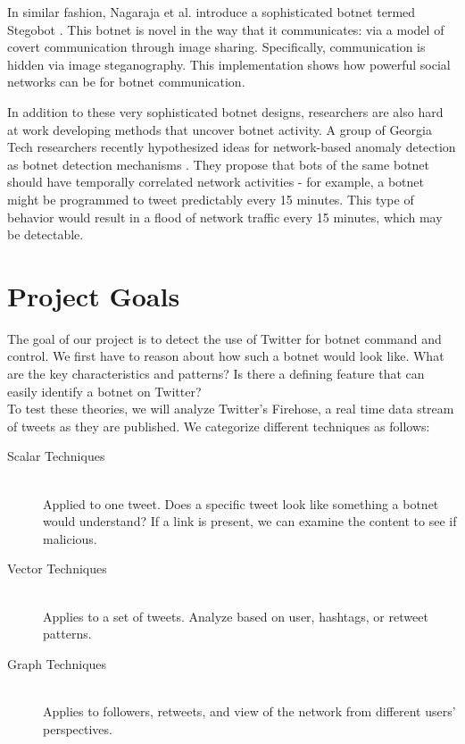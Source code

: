 \documentclass[paper=a4, fontsize=11pt]{scrartcl} %
\numberwithin{equation}{section} %
\numberwithin{figure}{section} %
\numberwithin{table}{section} %
\begin{document}
In similar fashion, Nagaraja et al. introduce a sophisticated botnet termed Stegobot \cite{stegobot}.
This botnet is novel in the way that it communicates: via a model of covert communication through image sharing. 
Specifically, communication is hidden via image steganography. 
This implementation shows how powerful social networks can be for botnet communication.

In addition to these very sophisticated botnet designs, researchers are also hard at work
developing methods that uncover botnet activity. A group of Georgia Tech researchers recently
hypothesized ideas for network-based anomaly detection as botnet detection mechanisms \cite{botsniffer}.
They propose that bots of the same botnet should have temporally correlated network activities - 
for example, a botnet might be programmed to tweet predictably every 15 minutes. 
This type of behavior would result in a flood of network traffic every 15 minutes, which may be detectable.

\section{Project Goals}

The goal of our project is to detect the use of Twitter for botnet command and control.  We first have to reason about how such a botnet would look like.  What are the key characteristics and patterns?  Is there a defining feature that can easily identify a botnet on Twitter?  \\

To test these theories, we will analyze Twitter's Firehose, a real time data stream of tweets as they are published. We categorize different techniques as follows:

\begin{description}

\item[Scalar Techniques] \hfill\\
	Applied to one tweet. Does a specific tweet look like something a botnet would understand?
	If a link is present, we can examine the content to see if malicious.

\item[Vector Techniques] \hfill\\
	Applies to a set of tweets. Analyze based on user, hashtags, or retweet patterns.

\item[Graph Techniques] \hfill \\
	Applies to followers, retweets, and view of the network from different users' perspectives.

\end{description}
\end{document}
